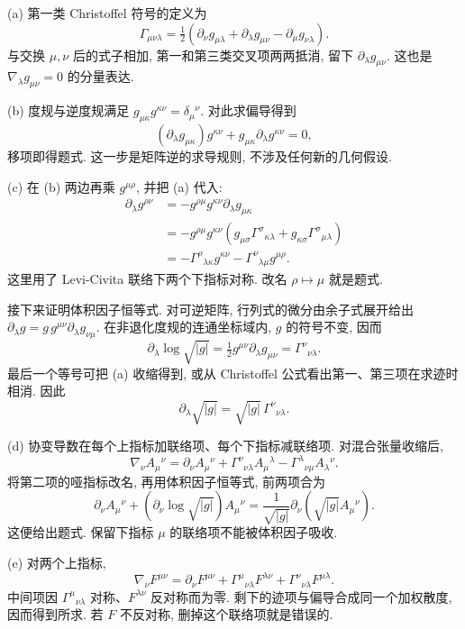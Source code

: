 \begin{solution}
(a) 第一类 Christoffel 符号的定义为
\[
 \Gamma_{\mu\nu\lambda}=\tfrac12
 (\partial_\nu g_{\mu\lambda}+\partial_\lambda g_{\mu\nu}-\partial_\mu g_{\nu\lambda}).
\]
与交换 $\mu,\nu$ 后的式子相加, 第一和第三类交叉项两两抵消, 留下 $\partial_\lambda g_{\mu\nu}$. 这也是 $\nabla_\lambda g_{\mu\nu}=0$ 的分量表达.

(b) 度规与逆度规满足 $g_{\mu\kappa}g^{\kappa\nu}=\delta_\mu{}^\nu$. 对此求偏导得到
\[
 (\partial_\lambda g_{\mu\kappa})g^{\kappa\nu}
 +g_{\mu\kappa}\partial_\lambda g^{\kappa\nu}=0,
\]
移项即得题式. 这一步是矩阵逆的求导规则, 不涉及任何新的几何假设.

(c) 在 (b) 两边再乘 $g^{\mu\rho}$, 并把 (a) 代入:
\begin{equation*}
\begin{aligned}
 \partial_\lambda g^{\rho\nu}
 &=-g^{\rho\mu}g^{\kappa\nu}\partial_\lambda g_{\mu\kappa}\\
 &=-g^{\rho\mu}g^{\kappa\nu}
 (g_{\mu\sigma}\Gamma^\sigma{}_{\kappa\lambda}
 +g_{\kappa\sigma}\Gamma^\sigma{}_{\mu\lambda})\\
 &=-\Gamma^\rho{}_{\lambda\kappa}g^{\kappa\nu}
 -\Gamma^\nu{}_{\lambda\mu}g^{\mu\rho}.
\end{aligned}
\end{equation*}
这里用了 Levi-Civita 联络下两个下指标对称. 改名 $\rho\mapsto\mu$ 就是题式.

接下来证明体积因子恒等式. 对可逆矩阵, 行列式的微分由余子式展开给出 $\partial_\lambda g=g\,g^{\mu\nu}\partial_\lambda g_{\nu\mu}$. 在非退化度规的连通坐标域内, $g$ 的符号不变, 因而
\[
 \partial_\lambda\log\sqrt{|g|}
 =\tfrac12g^{\mu\nu}\partial_\lambda g_{\mu\nu}
 =\Gamma^\nu{}_{\nu\lambda}.
\]
最后一个等号可把 (a) 收缩得到, 或从 Christoffel 公式看出第一、第三项在求迹时相消. 因此
\[
 \partial_\lambda\sqrt{|g|}=\sqrt{|g|}\,\Gamma^\nu{}_{\nu\lambda}.
\]

(d) 协变导数在每个上指标加联络项、每个下指标减联络项. 对混合张量收缩后,
\[
 \nabla_\nu A_\mu{}^\nu
 =\partial_\nu A_\mu{}^\nu
 +\Gamma^\nu{}_{\nu\lambda}A_\mu{}^\lambda
 -\Gamma^\lambda{}_{\nu\mu}A_\lambda{}^\nu.
\]
将第二项的哑指标改名, 再用体积因子恒等式, 前两项合为
\[
 \partial_\nu A_\mu{}^\nu
 +(\partial_\nu\log\sqrt{|g|})A_\mu{}^\nu
 =\frac1{\sqrt{|g|}}\partial_\nu(\sqrt{|g|}A_\mu{}^\nu).
\]
这便给出题式. 保留下指标 $\mu$ 的联络项不能被体积因子吸收.

(e) 对两个上指标,
\[
 \nabla_\nu F^{\mu\nu}=\partial_\nu F^{\mu\nu}
 +\Gamma^\mu{}_{\nu\lambda}F^{\lambda\nu}
 +\Gamma^\nu{}_{\nu\lambda}F^{\mu\lambda}.
\]
中间项因 $\Gamma^\mu{}_{\nu\lambda}$ 对称、$F^{\lambda\nu}$ 反对称而为零. 剩下的迹项与偏导合成同一个加权散度, 因而得到所求. 若 $F$ 不反对称, 删掉这个联络项就是错误的.


\end{solution}
